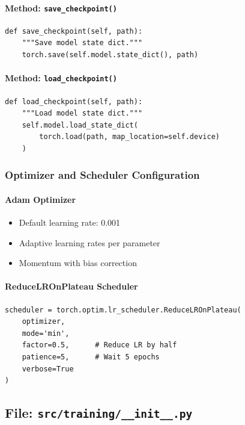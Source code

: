 \documentclass[11pt,a4paper]{article}
\begin{document}
\paragraph{Method: \texttt{save\_checkpoint()}}
\begin{lstlisting}
def save_checkpoint(self, path):
    """Save model state dict."""
    torch.save(self.model.state_dict(), path)
\end{lstlisting}

\paragraph{Method: \texttt{load\_checkpoint()}}
\begin{lstlisting}
def load_checkpoint(self, path):
    """Load model state dict."""
    self.model.load_state_dict(
        torch.load(path, map_location=self.device)
    )
\end{lstlisting}

\subsubsection{Optimizer and Scheduler Configuration}

\paragraph{Adam Optimizer}
\begin{itemize}
    \item Default learning rate: 0.001
    \item Adaptive learning rates per parameter
    \item Momentum with bias correction
\end{itemize}

\paragraph{ReduceLROnPlateau Scheduler}
\begin{lstlisting}
scheduler = torch.optim.lr_scheduler.ReduceLROnPlateau(
    optimizer,
    mode='min',
    factor=0.5,      # Reduce LR by half
    patience=5,      # Wait 5 epochs
    verbose=True
)
\end{lstlisting}

\subsection{File: \texttt{src/training/\_\_init\_\_.py}}
\end{document}

